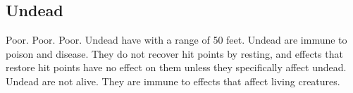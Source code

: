     \subsection{Undead}
         Poor.
         Poor.
         Poor.
         Undead have  with a range of 50 feet.
         Undead are immune to poison and disease.
        They do not recover hit points by resting, and effects that restore hit points have no effect on them unless they specifically affect undead.
         Undead are not alive.
        They are immune to effects that affect living creatures.
